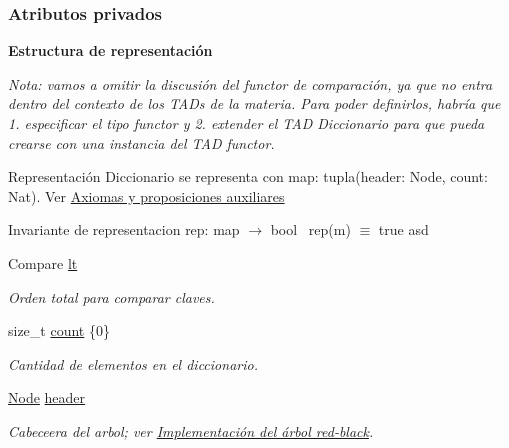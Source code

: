 \subsubsection*{Atributos privados}
\begin{Indent}\textbf{ Estructura de representación}\par
{\em Nota\+: vamos a omitir la discusión del functor de comparación, ya que no entra dentro del contexto de los T\+A\+Ds de la materia. Para poder definirlos, habría que 1. especificar el tipo functor y 2. extender el T\+AD Diccionario para que pueda crearse con una instancia del T\+AD functor.

\begin{DoxyParagraph}{Representación}
Diccionario se representa con map\+: tupla(header\+: Node, count\+: Nat). Ver \hyperlink{axiomas}{Axiomas y proposiciones auxiliares}
\end{DoxyParagraph}
\begin{DoxyParagraph}{Invariante de representacion}
rep\+: map $\to$ bool~\newline
 rep(m) $\equiv$ true  asd 
\end{DoxyParagraph}


 }\begin{DoxyCompactItemize}
\item 
Compare \hyperlink{classaed2_1_1map_a0e5be36fae0693e4665bd2a615e7550a_a0e5be36fae0693e4665bd2a615e7550a}{lt}
\begin{DoxyCompactList}\small\item\em Orden total para comparar claves. \end{DoxyCompactList}\item 
size\+\_\+t \hyperlink{classaed2_1_1map_a44236c4f16cdc20a10759862b198bde4_a44236c4f16cdc20a10759862b198bde4}{count} \{0\}
\begin{DoxyCompactList}\small\item\em Cantidad de elementos en el diccionario. \end{DoxyCompactList}\item 
\hyperlink{structaed2_1_1map_1_1Node}{Node} \hyperlink{classaed2_1_1map_a92d93f905c8ad73fba18fdc7e8915cce_a92d93f905c8ad73fba18fdc7e8915cce}{header}
\begin{DoxyCompactList}\small\item\em Cabeceera del arbol; ver \hyperlink{Implementacion}{Implementación del árbol red-\/black}. \end{DoxyCompactList}\end{DoxyCompactItemize}
\end{Indent}
